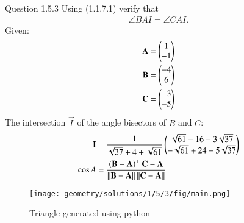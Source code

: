 \documentclass[journal,12pt,twocolumn]{IEEEtran}
\theoremstyle{remark}
\begin{document}
Question 1.5.3
Using (1.1.7.1) verify that 
\begin{align}\angle BAI = \angle CAI.\end{align}
\fi
Given:
\begin{align}
\mathbf{A} = \begin{pmatrix}1\\-1\end{pmatrix}\\
\mathbf{B} = \begin{pmatrix}-4\\6\end{pmatrix}\\
\mathbf{C} = \begin{pmatrix}-3\\-5\end{pmatrix}
\end{align}
The intersection $\vec{I}$ of the angle bisectors of $B$ and $C$:
\begin{align}
\mathbf{I} &= \frac{1}{\sqrt{37}+ 4 +\sqrt{61}}\begin{pmatrix}
{\sqrt{61}-16-3\sqrt{37}}\\
{-\sqrt{61}+24-5\sqrt{37}}
\end{pmatrix}\\
\cos{A} &= \frac{\left(\mathbf{B} - \mathbf{A}\right)^{\top}\mathbf{C} - \mathbf{A}}{\left\lVert\mathbf{B} - \mathbf{A}\right\rVert \left\lVert \mathbf{C} - \mathbf{A}\right\rVert}
\end{align}
\begin{figure}
\centering
\texttt{[image: geometry/solutions/1/5/3/fig/main.png]}
\caption{Triangle generated using python}
\label{fig:tri_sss_py}
\end{figure}
\solution
\end{document}
